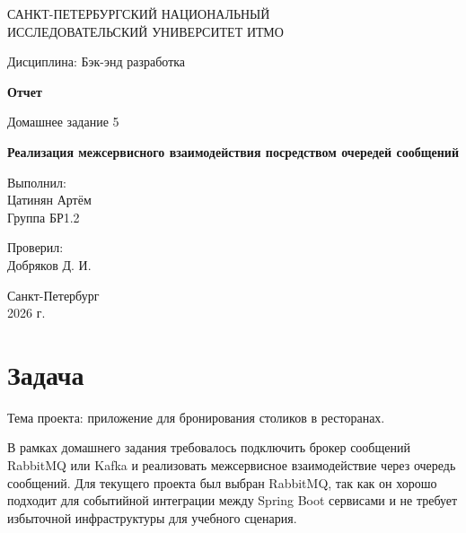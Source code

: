 \documentclass[14pt,a4paper]{extarticle}
\begin{document}
\begin{titlepage}
    \begin{center}
        САНКТ-ПЕТЕРБУРГСКИЙ НАЦИОНАЛЬНЫЙ\\
        ИССЛЕДОВАТЕЛЬСКИЙ УНИВЕРСИТЕТ ИТМО

        \vspace{1.5cm}

        Дисциплина: Бэк-энд разработка

        \vspace{1.5cm}

        \textbf{Отчет}

        \vspace{0.5cm}

        Домашнее задание 5

        \vspace{0.5cm}

        \textbf{Реализация межсервисного взаимодействия посредством очередей сообщений}

        \vfill

        \begin{flushright}
            Выполнил:\\
            Цатинян Артём\\
            Группа БР1.2

            \vspace{0.8cm}

            Проверил:\\
            Добряков Д. И.
        \end{flushright}

        \vfill

        Санкт-Петербург\\
        2026 г.
    \end{center}
\end{titlepage}

\section{Задача}

Тема проекта: приложение для бронирования столиков в ресторанах.

В рамках домашнего задания требовалось подключить брокер сообщений RabbitMQ или Kafka и реализовать межсервисное взаимодействие через очередь сообщений. Для текущего проекта был выбран RabbitMQ, так как он хорошо подходит для событийной интеграции между Spring Boot сервисами и не требует избыточной инфраструктуры для учебного сценария.
\end{document}
